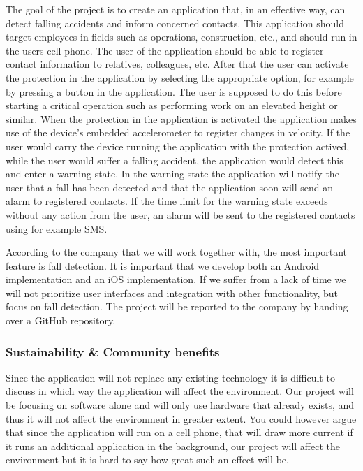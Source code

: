 \documentclass[12pt, a4paper, onecolumn]{article}
\begin{document}
	The goal of the project is to create an application that, in an effective way, can detect falling accidents and inform concerned contacts. This application should target employees in fields such as operations, construction, etc., and should run in the users cell phone. The user of the application should be able to register contact information to relatives, colleagues, etc. After that the user can activate the protection in the application by selecting the appropriate option, for example by pressing a button in the application. The user is supposed to do this before starting a critical operation such as performing work on an elevated height or similar. When the protection in the application is activated the application makes use of the device's embedded accelerometer to register changes in velocity. If the user would carry the device running the application with the protection actived, while the user would suffer a falling accident, the application would detect this and enter a warning state. In the warning state the application will notify the user that a fall has been detected and that the application soon will send an alarm to registered contacts. If the time limit for the warning state exceeds without any action from the user, an alarm will be sent to the registered contacts using for example SMS.
	
	According to the company that we will work together with, the most important feature is fall detection. It is important that we develop both an Android implementation and an iOS implementation. If we suffer from a lack of time we will not prioritize user interfaces and integration with other functionality, but focus on fall detection. The project will be reported to the company by handing over a GitHub repository.
	
	
	\subsubsection{Sustainability \& Community benefits}
	
	Since the application will not replace any existing technology it is difficult to discuss in which way the application will affect the environment. Our project will be focusing on software alone and will only use hardware that already exists, and thus it will not affect the environment in greater extent. You could however argue that since the application will run on a cell phone, that will draw more current if it runs an additional application in the background, our project will affect the environment but it is hard to say how great such an effect will be.
	
\end{document}
